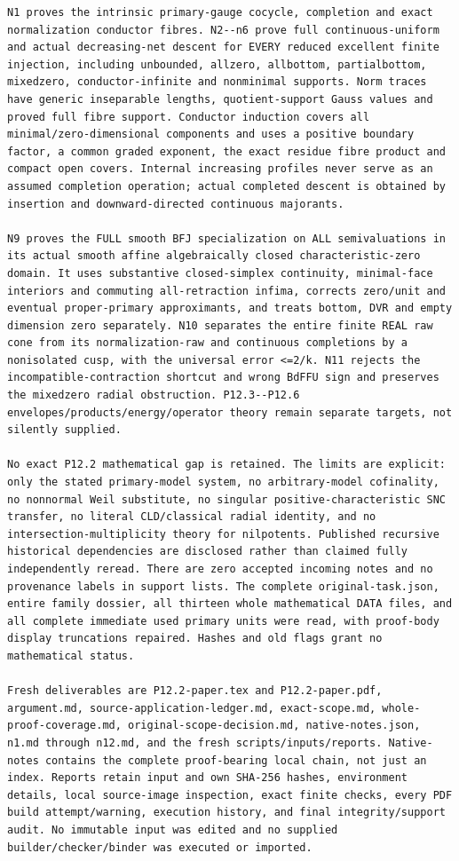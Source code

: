 \documentclass[
  11pt,
]{article}
\begin{document}
\begin{lstlisting}
N1 proves the intrinsic primary-gauge cocycle, completion and exact normalization conductor fibres. N2--n6 prove full continuous-uniform and actual decreasing-net descent for EVERY reduced excellent finite injection, including unbounded, allzero, allbottom, partialbottom, mixedzero, conductor-infinite and nonminimal supports. Norm traces have generic inseparable lengths, quotient-support Gauss values and proved full fibre support. Conductor induction covers all minimal/zero-dimensional components and uses a positive boundary factor, a common graded exponent, the exact residue fibre product and compact open covers. Internal increasing profiles never serve as an assumed completion operation; actual completed descent is obtained by insertion and downward-directed continuous majorants.

N9 proves the FULL smooth BFJ specialization on ALL semivaluations in its actual smooth affine algebraically closed characteristic-zero domain. It uses substantive closed-simplex continuity, minimal-face interiors and commuting all-retraction infima, corrects zero/unit and eventual proper-primary approximants, and treats bottom, DVR and empty dimension zero separately. N10 separates the entire finite REAL raw cone from its normalization-raw and continuous completions by a nonisolated cusp, with the universal error <=2/k. N11 rejects the incompatible-contraction shortcut and wrong BdFFU sign and preserves the mixedzero radial obstruction. P12.3--P12.6 envelopes/products/energy/operator theory remain separate targets, not silently supplied.

No exact P12.2 mathematical gap is retained. The limits are explicit: only the stated primary-model system, no arbitrary-model cofinality, no nonnormal Weil substitute, no singular positive-characteristic SNC transfer, no literal CLD/classical radial identity, and no intersection-multiplicity theory for nilpotents. Published recursive historical dependencies are disclosed rather than claimed fully independently reread. There are zero accepted incoming notes and no provenance labels in support lists. The complete original-task.json, entire family dossier, all thirteen whole mathematical DATA files, and all complete immediate used primary units were read, with proof-body display truncations repaired. Hashes and old flags grant no mathematical status.

Fresh deliverables are P12.2-paper.tex and P12.2-paper.pdf, argument.md, source-application-ledger.md, exact-scope.md, whole-proof-coverage.md, original-scope-decision.md, native-notes.json, n1.md through n12.md, and the fresh scripts/inputs/reports. Native-notes contains the complete proof-bearing local chain, not just an index. Reports retain input and own SHA-256 hashes, environment details, local source-image inspection, exact finite checks, every PDF build attempt/warning, execution history, and final integrity/support audit. No immutable input was edited and no supplied builder/checker/binder was executed or imported.


\end{lstlisting}
\end{document}
